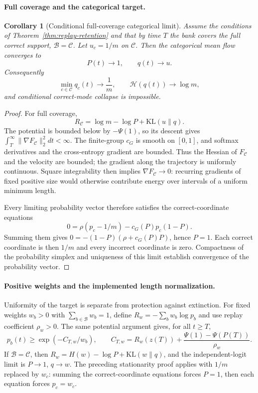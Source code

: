 \documentclass{article}
\newcommand{\1}{\mathbf 1}
\newtheorem{corollary}[lemma]{Corollary}
\theoremstyle{remark}
\theoremstyle{definition}
\theoremstyle{plain}
\begin{document}
\paragraph{Full coverage and the categorical target.}
\begin{corollary}[Conditional full-coverage categorical limit]
\label{cor:replay-no-collapse}
Assume the conditions of Theorem~\ref{thm:replay-retention} and that by time
$T$ the bank covers the full correct support, $\mathcal B=\mathcal C$. Let
$u_c=1/m$ on $\mathcal C$. Then the categorical mean flow converges to
\[
  P(t)\longrightarrow1,
  \qquad q(t)\longrightarrow u.
\]
Consequently
\[
  \min_{c\in\mathcal C}q_c(t)\longrightarrow\frac1m,
  \qquad
  \mathcal H(q(t))\longrightarrow\log m,
\]
and conditional correct-mode collapse is impossible.
\end{corollary}

\begin{proof}
For full coverage,
\begin{equation}
 R_{\mathcal C}=\log m-\log P+\mathrm{KL}(u\|q).
 \label{eq:replay-mass-uniformity-decomposition}
\end{equation}
The potential is bounded below by $-\Psi(1)$, so its descent gives
$\int_T^\infty\|\nabla F_{\mathcal C}\|_2^2dt<\infty$. The finite-group
$c_G$ is smooth on $[0,1]$, and softmax derivatives and the cross-entropy
gradient are bounded. Thus the Hessian of $F_{\mathcal C}$ and the velocity
are bounded; the gradient along the trajectory is uniformly continuous.
Square integrability then implies $\nabla F_{\mathcal C}\to0$: recurring
gradients of fixed positive size would otherwise contribute energy over
intervals of a uniform minimum length.

Every limiting probability vector therefore satisfies the correct-coordinate
equations
\[
 0=\rho(p_c-1/m)-c_G(P)p_c(1-P).
\]
Summing them gives $0=-(1-P)(\rho+c_G(P)P)$, hence $P=1$. Each correct
coordinate is then $1/m$ and every incorrect coordinate is zero. Compactness
of the probability simplex and uniqueness of this limit establish convergence
of the probability vector.
\end{proof}

\paragraph{Positive weights and the implemented length normalization.}
Uniformity of the target is separate from protection against extinction.
For fixed weights $w_b>0$ with $\sum_{b\in\mathcal B}w_b=1$, define
$R_w=-\sum_b w_b\log p_b$ and use replay coefficient $\rho_w>0$.
The same potential argument gives, for all $t\ge T$,
\[
 p_b(t)\ge\exp(-C_{T,w}/w_b),\qquad
 C_{T,w}=R_w(z(T))+\frac{\Psi(1)-\Psi(P(T))}{\rho_w}.
\]
If $\mathcal B=\mathcal C$, then
$R_w=H(w)-\log P+\mathrm{KL}(w\|q)$, and the independent-logit limit is
$P\to1$, $q\to w$. The preceding stationarity proof applies with $1/m$
replaced by $w_c$: summing the correct-coordinate equations forces $P=1$,
then each equation forces $p_c=w_c$.
\end{document}
